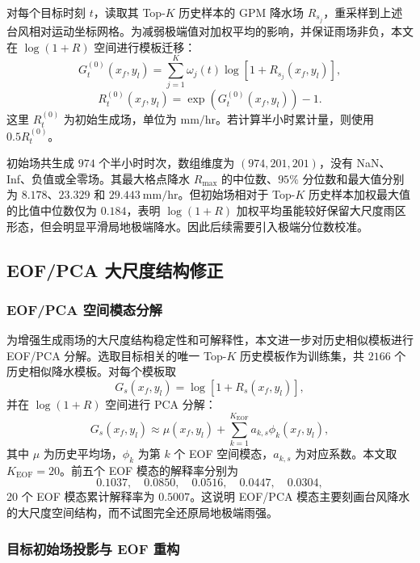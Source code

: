 \documentclass[UTF8,a4paper,zihao=5]{ctexart}
\numberwithin{equation}{section}
\numberwithin{figure}{section}
\numberwithin{table}{section}
\begin{document}
对每个目标时刻 $t$，读取其 Top-$K$ 历史样本的 GPM 降水场 $R_{s_j}$，重采样到上述台风相对运动坐标网格。为减弱极端值对加权平均的影响，并保证雨场非负，本文在 $\log(1+R)$ 空间进行模板迁移：
\begin{equation}
G_t^{(0)}(x_f,y_l)
=
\sum_{j=1}^{K}\omega_j(t)\log\left[1+R_{s_j}(x_f,y_l)\right],
\end{equation}
\begin{equation}
R_t^{(0)}(x_f,y_l)
=
\exp\left(G_t^{(0)}(x_f,y_l)\right)-1.
\end{equation}
这里 $R_t^{(0)}$ 为初始生成场，单位为 \(\mathrm{mm/hr}\)。若计算半小时累计量，则使用 $0.5R_t^{(0)}$。

初始场共生成 $974$ 个半小时时次，数组维度为 $(974,201,201)$，没有 NaN、Inf、负值或全零场。其最大格点降水 $R_{\max}$ 的中位数、$95\%$ 分位数和最大值分别为 $8.178$、$23.329$ 和 $29.443\ \mathrm{mm/hr}$。但初始场相对于 Top-$K$ 历史样本加权最大值的比值中位数仅为 $0.184$，表明 $\log(1+R)$ 加权平均虽能较好保留大尺度雨区形态，但会明显平滑局地极端降水。因此后续需要引入极端分位数校准。

\subsection{EOF/PCA 大尺度结构修正}

\subsubsection{EOF/PCA 空间模态分解}

为增强生成雨场的大尺度结构稳定性和可解释性，本文进一步对历史相似模板进行 EOF/PCA 分解。选取目标相关的唯一 Top-$K$ 历史模板作为训练集，共 $2166$ 个历史相似降水模板。对每个模板取
\begin{equation}
G_s(x_f,y_l)=\log\left[1+R_s(x_f,y_l)\right],
\end{equation}
并在 $\log(1+R)$ 空间进行 PCA 分解：
\begin{equation}
G_s(x_f,y_l)
\approx
\mu(x_f,y_l)+
\sum_{k=1}^{K_{\mathrm{EOF}}}a_{k,s}\phi_k(x_f,y_l),
\end{equation}
其中 $\mu$ 为历史平均场，$\phi_k$ 为第 $k$ 个 EOF 空间模态，$a_{k,s}$ 为对应系数。本文取 $K_{\mathrm{EOF}}=20$。前五个 EOF 模态的解释率分别为
\[
0.1037,\quad 0.0850,\quad 0.0516,\quad 0.0447,\quad 0.0304,
\]
20 个 EOF 模态累计解释率为 $0.5007$。这说明 EOF/PCA 模态主要刻画台风降水的大尺度空间结构，而不试图完全还原局地极端雨强。

\subsubsection{目标初始场投影与 EOF 重构}
\end{document}
